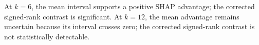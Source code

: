 At $k=6$, the mean interval supports a positive SHAP advantage; the corrected signed-rank contrast is significant. At $k=12$, the mean advantage remains uncertain because its interval crosses zero; the corrected signed-rank contrast is not statistically detectable.
